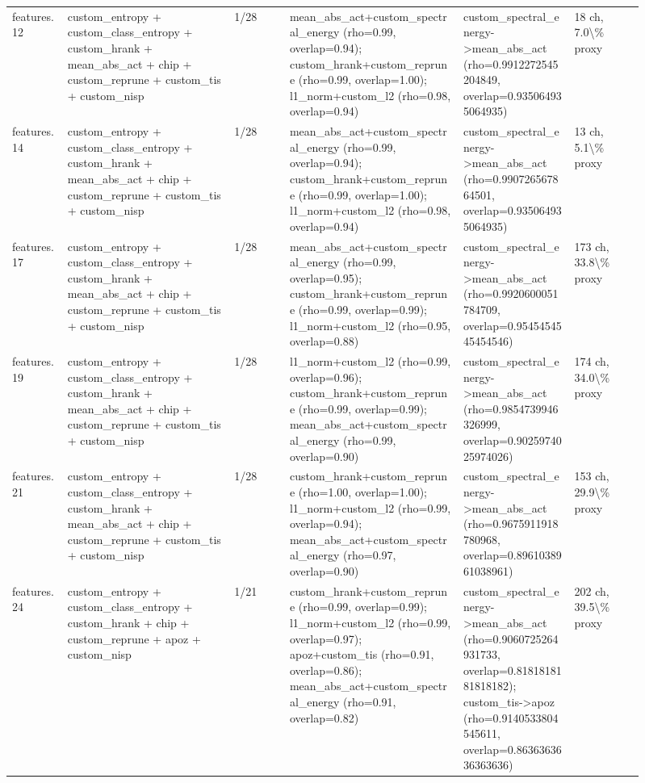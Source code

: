 \documentclass[10pt]{article}
\begin{document}
\begin{longtable}{p{0.08\linewidth}p{0.24\linewidth}p{0.08\linewidth}p{0.25\linewidth}p{0.16\linewidth}p{0.10\linewidth}}
features.12 & custom\_entropy + custom\_class\_entropy + custom\_hrank + mean\_abs\_act + chip + custom\_reprune + custom\_tis + custom\_nisp & 1/28 & mean\_abs\_act+custom\_spectral\_energy (rho=0.99, overlap=0.94); custom\_hrank+custom\_reprune (rho=0.99, overlap=1.00); l1\_norm+custom\_l2 (rho=0.98, overlap=0.94) & custom\_spectral\_energy->mean\_abs\_act (rho=0.9912272545204849, overlap=0.935064935064935) & 18 ch, 7.0\textbackslash{}\% proxy \\
features.14 & custom\_entropy + custom\_class\_entropy + custom\_hrank + mean\_abs\_act + chip + custom\_reprune + custom\_tis + custom\_nisp & 1/28 & mean\_abs\_act+custom\_spectral\_energy (rho=0.99, overlap=0.94); custom\_hrank+custom\_reprune (rho=0.99, overlap=1.00); l1\_norm+custom\_l2 (rho=0.98, overlap=0.94) & custom\_spectral\_energy->mean\_abs\_act (rho=0.990726567864501, overlap=0.935064935064935) & 13 ch, 5.1\textbackslash{}\% proxy \\
features.17 & custom\_entropy + custom\_class\_entropy + custom\_hrank + mean\_abs\_act + chip + custom\_reprune + custom\_tis + custom\_nisp & 1/28 & mean\_abs\_act+custom\_spectral\_energy (rho=0.99, overlap=0.95); custom\_hrank+custom\_reprune (rho=0.99, overlap=0.99); l1\_norm+custom\_l2 (rho=0.95, overlap=0.88) & custom\_spectral\_energy->mean\_abs\_act (rho=0.9920600051784709, overlap=0.9545454545454546) & 173 ch, 33.8\textbackslash{}\% proxy \\
features.19 & custom\_entropy + custom\_class\_entropy + custom\_hrank + mean\_abs\_act + chip + custom\_reprune + custom\_tis + custom\_nisp & 1/28 & l1\_norm+custom\_l2 (rho=0.99, overlap=0.96); custom\_hrank+custom\_reprune (rho=0.99, overlap=0.99); mean\_abs\_act+custom\_spectral\_energy (rho=0.99, overlap=0.90) & custom\_spectral\_energy->mean\_abs\_act (rho=0.9854739946326999, overlap=0.9025974025974026) & 174 ch, 34.0\textbackslash{}\% proxy \\
features.21 & custom\_entropy + custom\_class\_entropy + custom\_hrank + mean\_abs\_act + chip + custom\_reprune + custom\_tis + custom\_nisp & 1/28 & custom\_hrank+custom\_reprune (rho=1.00, overlap=1.00); l1\_norm+custom\_l2 (rho=0.99, overlap=0.94); mean\_abs\_act+custom\_spectral\_energy (rho=0.97, overlap=0.90) & custom\_spectral\_energy->mean\_abs\_act (rho=0.9675911918780968, overlap=0.8961038961038961) & 153 ch, 29.9\textbackslash{}\% proxy \\
features.24 & custom\_entropy + custom\_class\_entropy + custom\_hrank + chip + custom\_reprune + apoz + custom\_nisp & 1/21 & custom\_hrank+custom\_reprune (rho=0.99, overlap=0.99); l1\_norm+custom\_l2 (rho=0.99, overlap=0.97); apoz+custom\_tis (rho=0.91, overlap=0.86); mean\_abs\_act+custom\_spectral\_energy (rho=0.91, overlap=0.82) & custom\_spectral\_energy->mean\_abs\_act (rho=0.9060725264931733, overlap=0.8181818181818182); custom\_tis->apoz (rho=0.9140533804545611, overlap=0.8636363636363636) & 202 ch, 39.5\textbackslash{}\% proxy \\

\end{longtable}
\end{document}
